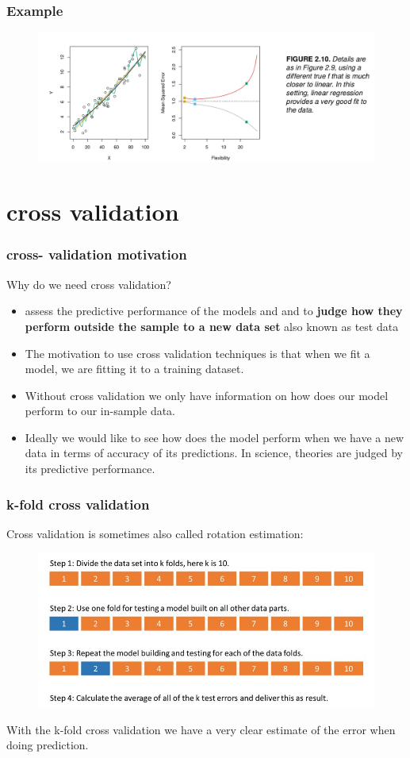 \documentclass{beamer}
\begin{document}
\begin{frame}
\frametitle{Example}
\begin{figure}
\includegraphics[width = 1\linewidth]{figures/03/figure_2_7.png}
\end{figure}
\end{frame}


\section{cross validation}
\begin{frame}
\frametitle{cross- validation motivation}
Why do we need cross validation?
\begin{itemize}
\item assess the predictive performance of the models and and to \textbf{ judge how they perform outside the sample to a new data set} also known as test data
\item The motivation to use cross validation techniques is that when we fit a model, we are fitting it to a training dataset.
\item  Without cross validation we only have information on how does our model perform to our in-sample data.
\item Ideally we would like to see how does the model perform when we have a new data in terms of accuracy of its predictions. In science, theories are judged by its predictive performance.
\end{itemize}

   
\end{frame}

\begin{frame}
\frametitle{k-fold cross validation}
Cross validation is sometimes also called rotation estimation:
\begin{figure}
\includegraphics[width = 1\linewidth]{figures/03/blog3-2.jpg}
\end{figure}
With the k-fold cross validation we have a very clear estimate of the error when doing prediction.
\end{frame}
\end{document}
